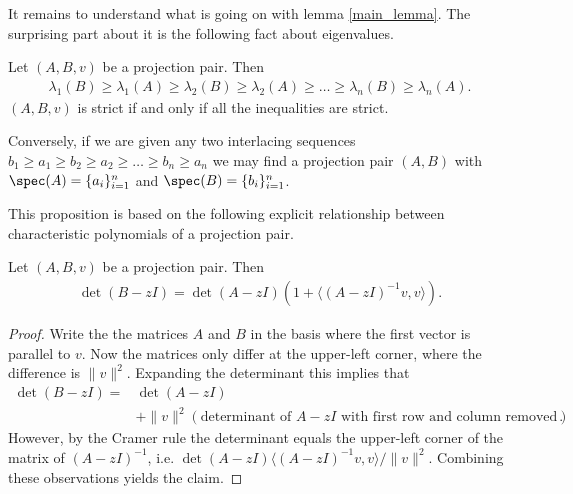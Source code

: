 It remains to understand what is going on with lemma \ref{main_lemma}. The surprising part about it is the following fact about eigenvalues.

\begin{lem}\label{projection_eigenvalues}
	Let $(A, B, v)$ be a projection pair. Then
	\begin{align*}
		\lambda_{1}(B) \geq \lambda_{1}(A) \geq \lambda_{2}(B) \geq \lambda_{2}(A) \geq \ldots \geq \lambda_{n}(B) \geq \lambda_{n}(A).
	\end{align*}
	$(A, B, v)$ is strict if and only if all the inequalities are strict.

	Conversely, if we are given any two interlacing sequences $b_{1} \geq a_{1} \geq b_{2} \geq a_{2} \geq \ldots \geq b_{n} \geq a_{n}$ we may find a projection pair $(A, B)$ with $\spec(A) = \{a_{i}\}_{i = 1}^{n}$ and $\spec(B) = \{b_{i}\}_{i = 1}^{n}$.
\end{lem}

This proposition is based on the following explicit relationship between characteristic polynomials of a projection pair.

\begin{lem}\label{projection_characteristic_polynomial}
	Let $(A, B, v)$ be a projection pair. Then
	\begin{align*}
		\det(B - z I) = \det(A - z I) \left(1 + \langle (A - z I)^{-1}v, v\rangle\right).
	\end{align*}
\end{lem}
\begin{proof}
	Write the the matrices $A$ and $B$ in the basis where the first vector is parallel to $v$. Now the matrices only differ at the upper-left corner, where the difference is $\|v\|^2$. Expanding the determinant this implies that
	\begin{align*}
		\det(B - z I) =& \det(A - z I) \\
		&+ \|v\|^2 \left(\text{determinant of $A - zI$ with first row and column removed} \right).
	\end{align*}
	However, by the Cramer rule the determinant equals the upper-left corner of the matrix of $(A - z I)^{-1}$, i.e. $\det(A - z I) \langle (A - zI)^{-1} v, v \rangle/\|v\|^2$. Combining these observations yields the claim.
\end{proof}

